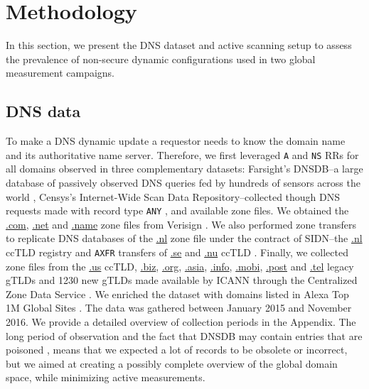 \section{Methodology}

In this section, we present the DNS dataset and active scanning setup to assess the prevalence of non-secure dynamic configurations used in two global measurement campaigns.

\subsection{DNS data \label{sec:dataset}}

To make a DNS dynamic update a requestor needs to know the domain name and its authoritative name server.
Therefore, we first  leveraged \texttt{A} and \texttt{NS} RRs for all domains observed in three complementary datasets: Farsight's DNSDB--a large database of passively observed DNS queries fed by hundreds of sensors across the world \cite{dnsdb}, Censys's Internet-Wide Scan Data Repository--collected though DNS requests made with record type \texttt{ANY} \cite{scansio}, and available zone files. 
We obtained  the \url{.com}, \url{.net} and \url{.name} zone files from Verisign \cite{verisign}. 
We also performed zone transfers to replicate DNS databases of the \url{.nl} zone file under the contract of SIDN--the \url{.nl} ccTLD registry \cite{sidn} and \texttt{AXFR} transfers of \url{.se} and \url{.nu} ccTLD \cite{se}. Finally, we collected zone files from the \url{.us} ccTLD, \url{.biz}, \url{.org}, \url{.asia}, \url{.info}, \url{.mobi}, \url{.post} and \url{.tel} legacy gTLDs and 1230 new gTLDs made available by ICANN through the Centralized Zone Data Service \cite{icann-czds}. We enriched the dataset with domains listed in Alexa Top 1M Global Sites \cite{alexa}. The data was gathered between January 2015 and November 2016. We provide a detailed overview of collection periods in the Appendix.
 The long period of observation and the fact that DNSDB may contain entries that are poisoned \cite{Dagon}, means that we expected a lot of records to be obsolete or incorrect, but we aimed at creating a possibly complete overview of the global domain space, while minimizing active measurements.

